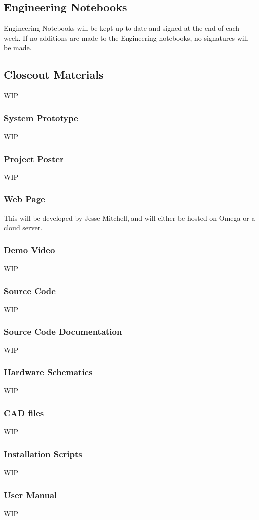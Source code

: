 \subsection{Engineering Notebooks}
Engineering Notebooks will be kept up to date and signed at the end of each week. If no additions are made to the Engineering notebooks, no signatures will be made.

\subsection{Closeout Materials}
WIP

\subsubsection{System Prototype}
WIP

\subsubsection{Project Poster}
WIP

\subsubsection{Web Page}
This will be developed by Jesse Mitchell, and will either be hosted on Omega or a cloud server.

\subsubsection{Demo Video}
WIP

\subsubsection{Source Code}
WIP

\subsubsection{Source Code Documentation}
WIP

\subsubsection{Hardware Schematics}
WIP

\subsubsection{CAD files}
WIP

\subsubsection{Installation Scripts}
WIP

\subsubsection{User Manual}
WIP